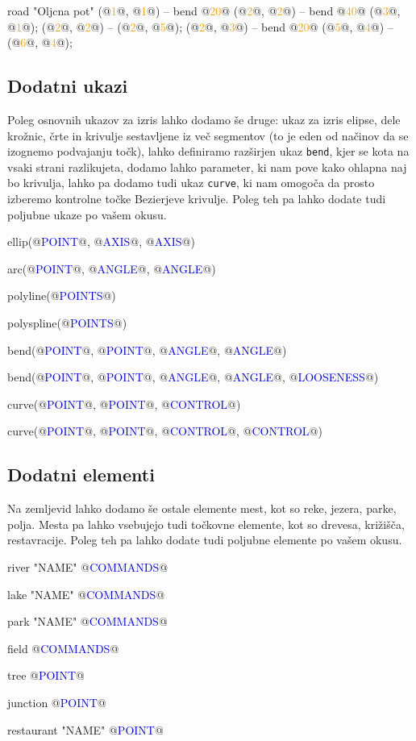 \documentclass{article}
\newcommand\Var[1]{\textcolor{blue}{#1}}
\newcommand\Num[1]{\textcolor{orange}{#1}}
\newcommand\Fun[1]{{\texttt{#1}}}
\begin{document}
\begin{CITY}
  road "Oljcna pot" {
    (@\Num{1}@, @\Num{1}@) -- bend @\Num{20}@ (@\Num{2}@, @\Num{2}@) -- bend @\Num{40}@ (@\Num{3}@, @\Num{1}@);
    (@\Num{2}@, @\Num{2}@) -- (@\Num{2}@, @\Num{5}@);
    (@\Num{2}@, @\Num{3}@) -- bend @\Num{20}@ (@\Num{5}@, @\Num{4}@) -- (@\Num{6}@, @\Num{4}@);
  }
\end{CITY}

\subsection{Dodatni ukazi}
Poleg osnovnih ukazov za izris lahko dodamo še druge: ukaz za izris elipse, dele krožnic, črte in krivulje sestavljene iz več segmentov (to je eden od načinov da se izognemo podvajanju točk), lahko definiramo razširjen ukaz \Fun{bend}, kjer se kota na vsaki strani razlikujeta, dodamo lahko parameter, ki nam pove kako ohlapna naj bo krivulja, lahko pa dodamo tudi ukaz \Fun{curve}, ki nam omogoča da prosto izberemo kontrolne točke Bezierjeve krivulje.
Poleg teh pa lahko dodate tudi poljubne ukaze po vašem okusu.

\begin{CITY}
  ellip(@\Var{POINT}@, @\Var{AXIS}@, @\Var{AXIS}@)

  arc(@\Var{POINT}@, @\Var{ANGLE}@, @\Var{ANGLE}@)

  polyline(@\Var{POINTS}@)

  polyspline(@\Var{POINTS}@)

  bend(@\Var{POINT}@, @\Var{POINT}@, @\Var{ANGLE}@, @\Var{ANGLE}@)

  bend(@\Var{POINT}@, @\Var{POINT}@, @\Var{ANGLE}@, @\Var{ANGLE}@, @\Var{LOOSENESS}@)

  curve(@\Var{POINT}@, @\Var{POINT}@, @\Var{CONTROL}@)

  curve(@\Var{POINT}@, @\Var{POINT}@, @\Var{CONTROL}@, @\Var{CONTROL}@)
\end{CITY}

\subsection{Dodatni elementi}
Na zemljevid lahko dodamo še ostale elemente mest, kot so reke, jezera, parke, polja.
Mesta pa lahko vsebujejo tudi točkovne elemente, kot so drevesa, križišča, restavracije.
Poleg teh pa lahko dodate tudi poljubne elemente po vašem okusu.

\begin{CITY}
  river "NAME" {
    @\Var{COMMANDS}@
  }

  lake "NAME" {
    @\Var{COMMANDS}@
  }

  park "NAME" {
    @\Var{COMMANDS}@
  }

  field {
    @\Var{COMMANDS}@
  }

  tree @\Var{POINT}@

  junction @\Var{POINT}@

  restaurant "NAME" @\Var{POINT}@
\end{CITY}
\end{document}
